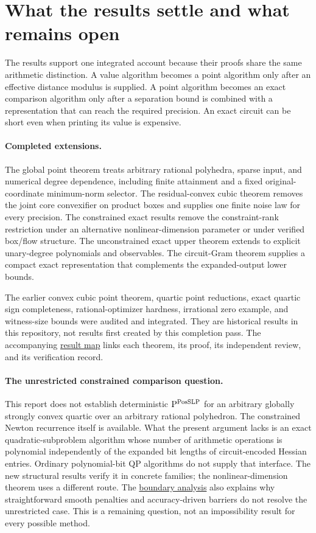 \section{What the results settle and what remains open}
\label{sec:scope}

The results support one integrated account because their proofs share the
same arithmetic distinction. A value algorithm becomes a point algorithm
only after an effective distance modulus is supplied. A point algorithm
becomes an exact comparison algorithm only after a separation bound is
combined with a representation that can reach the required precision.
An exact circuit can be short even when printing its value is expensive.

\paragraph{Completed extensions.}
The global point theorem treats arbitrary rational polyhedra, sparse input,
and numerical degree dependence, including finite attainment and a fixed
original-coordinate minimum-norm selector. The residual-convex cubic theorem
removes the joint core convexifier on product boxes and supplies one finite
noise law for every precision. The constrained exact results remove the
constraint-rank restriction under an alternative nonlinear-dimension
parameter or under verified box/flow structure. The unconstrained exact
upper theorem extends to explicit unary-degree polynomials and observables.
The circuit-Gram theorem supplies a compact exact representation that
complements the expanded-output lower bounds.

The earlier convex cubic point theorem, quartic point reductions, exact
quartic sign completeness, rational-optimizer hardness, irrational zero
example, and witness-size bounds were audited and integrated. They are
historical results in this repository, not results first created by this
completion pass. The accompanying
\href{../README.md}{result map} links each theorem, its proof, its independent
review, and its verification record.

\paragraph{The unrestricted constrained comparison question.}
This report does not establish deterministic $\mathrm P^{\mathrm{PosSLP}}$ for an
arbitrary globally strongly convex quartic over an arbitrary rational
polyhedron. The constrained Newton recurrence itself is available. What
the present argument lacks is an exact quadratic-subproblem algorithm whose
number of arithmetic operations is polynomial independently of the expanded
bit lengths of circuit-encoded Hessian entries. Ordinary polynomial-bit QP
algorithms do not supply that interface. The new structural results verify
it in concrete families; the nonlinear-dimension theorem uses a different
route. The \href{../constrained-exact/general-boundary.md}{boundary analysis}
also explains why straightforward smooth penalties and accuracy-driven
barriers do not resolve the unrestricted case. This is a remaining question,
not an impossibility result for every possible method.

